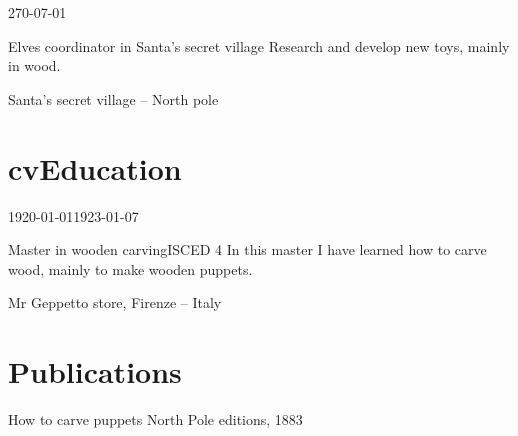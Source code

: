 \documentclass[a4paper]{epasscv} %
\begin{document}
\begin{timespan}{270-07-01}{} %
  \begin{occupation}{Elves coordinator in Santa's secret village}
    Research and develop new toys, mainly in wood.
  \end{occupation}  
  \begin{company}
    Santa's secret village -- North pole
  \end{company}
\end{timespan}


\section{cvEducation}

\begin{timespan}{1920-01-01}{1923-01-07}
  \begin{education}{Master in wooden carving}{ISCED 4}
    In this master I have learned how to carve wood, mainly to make
    wooden puppets.
  \end{education}
  
  \begin{institute}
    Mr Geppetto store, Firenze -- Italy
  \end{institute}
\end{timespan}

\section{\cvPersonalSkills}

\cvmothertongue{\cvEN}
\begin{cvotherlanguages}
\end{cvotherlanguages}



\section{Publications}

  {How to carve puppets}
  {North Pole editions, 1883}
\end{document}
